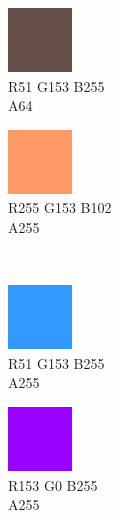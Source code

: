 \begin{figure}[h]
	\begin{subfigure}{0.105\textwidth}
		\centering
		\includegraphics[scale=1, frame]{gui-imgs/R255G153B102A64}
		\vspace*{-20px} \caption*{\hspace*{-0.25px}\tiny R51 G153 B255 \\ \tiny A64}
	\end{subfigure}
	\begin{subfigure}{0.105\textwidth}
		\centering
		\includegraphics[scale=1, frame]{gui-imgs/R255G153B102A255}
		\vspace*{-20px} \caption*{\hspace*{-0.25px}\tiny R255 G153 B102 \\ \tiny A255}
	\end{subfigure} \\
 	\begin{subfigure}{0.105\textwidth}
		\centering
		\includegraphics[scale=1, frame]{gui-imgs/R51G153B255A255}
		\vspace*{-20px} \caption*{\hspace*{-0.25px}\tiny R51 G153 B255 \\ \tiny A255}
	\end{subfigure}
	\begin{subfigure}{0.105\textwidth}
		\centering
		\includegraphics[scale=1, frame]{gui-imgs/R153G0B255A255}
		\vspace*{-20px} \caption*{\hspace*{-0.25px}\tiny R153 G0 B255 \\ \tiny A255}
	\end{subfigure}
	\begin{subfigure}{0.105\textwidth}

\end{subfigure}
\end{figure}

